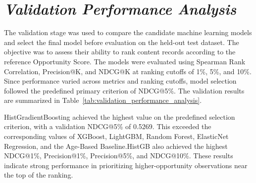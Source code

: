 \documentclass[12pt,a4paper]{report}
\begin{document}
\section{\textit{Validation Performance Analysis}}
The validation stage was used to compare the candidate machine learning models and select the final model before evaluation on the held-out test dataset. The objective was to assess their ability to rank content records according to the reference Opportunity Score. The models were evaluated using Spearman Rank Correlation, Precision@K, and NDCG@K at ranking cutoffs of 1\%, 5\%, and 10\%. Since performance varied across metrics and ranking cutoffs, model selection followed the predefined primary criterion of NDCG@5\%. The validation results are summarized in Table~\ref{tab:validation_performance_analysis}.

\begin{table}[htbp]
\centering
\caption{Validation Performance Analysis of Candidate Models}
\label{tab:validation_performance_analysis}
\end{table}
HistGradientBoosting achieved the highest value on the predefined selection criterion, with a validation NDCG@5\% of 0.5269. This exceeded the corresponding values of XGBoost, LightGBM, Random Forest, ElasticNet Regression, and the Age-Based Baseline.HistGB also achieved the highest NDCG@1\%, Precision@1\%, Precision@5\%, and NDCG@10\%. These results indicate strong performance in prioritizing higher-opportunity observations near the top of the ranking.
\end{document}
